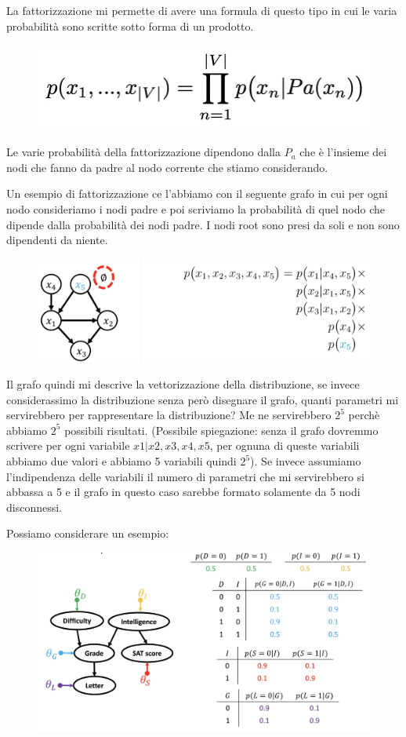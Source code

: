 \documentclass[14pt]{extreport}
\begin{document}
La fattorizzazione mi permette di avere una formula di questo tipo in cui le varia probabilità sono scritte sotto forma di un prodotto.

\begin{figure}[H]
	\centering
	\includegraphics[width=0.4\linewidth]{99.jpeg}
\end{figure}

Le varie probabilità della fattorizzazione dipendono dalla $P_a$ che è l'insieme dei nodi che fanno da padre al nodo corrente che stiamo considerando.

Un esempio di fattorizzazione ce l'abbiamo con il seguente grafo in cui per ogni nodo consideriamo i nodi padre e poi scriviamo la probabilità di quel
nodo che dipende dalla probabilità dei nodi padre. I nodi root sono presi da soli e non sono dipendenti da niente.

\begin{figure}[H]
	\centering
	\includegraphics[width=0.7\linewidth]{101.jpeg}
\end{figure}

Il grafo quindi mi descrive la vettorizzazione della distribuzione, se invece considerassimo la distribuzione senza però disegnare il grafo, quanti
parametri mi servirebbero per rappresentare la distribuzione? Me ne servirebbero $2^5$ perchè abbiamo $2^5$ possibili risultati. (Possibile
spiegazione: senza il grafo dovremmo scrivere per ogni variabile $x1|x2,x3,x4,x5$, per ognuna di queste variabili abbiamo due valori e abbiamo 5
variabili quindi $2^5$). Se invece assumiamo l'indipendenza delle variabili il numero di parametri che mi servirebbero si abbassa a 5 e il grafo in
questo caso sarebbe formato solamente da 5 nodi disconnessi.

Possiamo considerare un esempio:

\begin{figure}[H]
	\centering
	\includegraphics[width=0.7\linewidth]{102.jpeg}
\end{figure}
\end{document}
